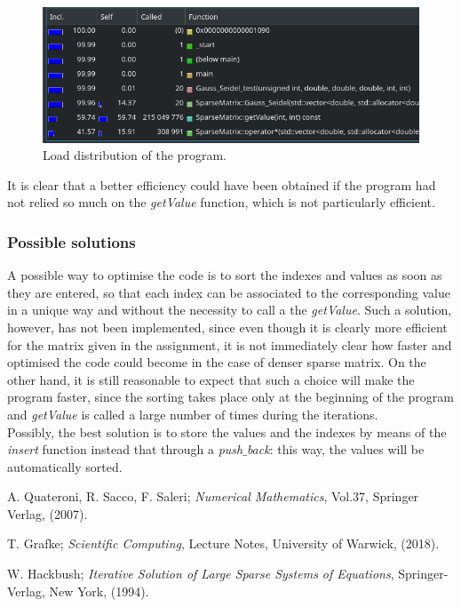 \documentclass{article}
\theoremstyle{theorem}
\theoremstyle{definition}
\begin{document}
\begin{figure}[H]
	\begin{center}
		\includegraphics[width=1.0\textwidth]{kcache_perf}
	\end{center}
	\caption{Load distribution of the program.
		\label{fig:load-distr}}
\end{figure} 

It is clear that a better efficiency could have been obtained if the program had not relied so much on the \emph{getValue} function, which is not particularly efficient.\\

\subsubsection{Possible solutions}
A possible way to optimise the code is to sort the indexes and values as soon as they are entered, so that each index can be associated to the corresponding value in a unique way and without the necessity to call a the \emph{getValue}. Such a solution, however, has not been implemented, since even though it is clearly more efficient for the matrix given in the assignment, it is not immediately clear how faster and optimised the code could become in the case of denser sparse matrix. On the other hand, it is still reasonable to expect that such a choice will make the program faster, since the sorting takes place only at the beginning of the program and \emph{getValue} is called a large number of times during the iterations.\\
Possibly, the best solution is to store the values and the indexes by means of the \emph{insert} function instead that through a \emph{push$\_$back}: this way, the values
 will be automatically sorted.\\



\cleardoublepage
\begin{thebibliography}{99}

 A. Quateroni, R. Sacco, F. Saleri;
\emph{Numerical Mathematics}, Vol.37, Springer Verlag, (2007).

 T. Grafke;
\emph{Scientific Computing}, Lecture Notes, University of Warwick, (2018).

 W. Hackbush; 
\emph{Iterative Solution of Large Sparse Systems of Equations}, Springer-Verlag, New York, (1994).







\printindex
\end{thebibliography}
\end{document}
